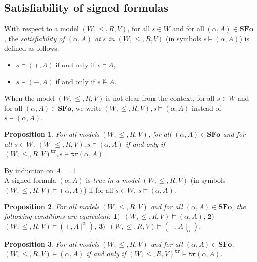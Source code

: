 \documentclass[draft]{article}
\newtheorem{proposition}{Proposition}
\newenvironment{proof}{{\bf Proof:}}{~$\dashv$\\}
\def\SFo{\mathbf{SFo}}
\begin{document}
\subsection{Satisfiability of signed formulas}
%
%
With respect to a model $(W,{\leq},{R},V)$, for all $s{\in}W$ and for all $(\alpha,A){\in}\SFo$, the {\em satisfiability of $(\alpha,A)$ at $s$ in $(W,{\leq},{R},V)$}\/ (in symbols $s{\models}(\alpha,A)$) is defined as follows:
%
%
\begin{itemize}
%
%
\item $s{\models}(+,A)$ if and only if $s{\models}A$,
%
%
\item $s{\models}(-,A)$ if and only if $s{\not\models}A$.
%
%
\end{itemize}
%
%
When the model $(W,{\leq},{R},V)$ is not clear from the context, for all $s{\in}W$ and for all $(\alpha,A){\in}\SFo$, we write $(W,{\leq},{R},V),s{\models}(\alpha,A)$ instead of $s{\models}(\alpha,A)$.
%
%
\begin{proposition}\label{Proposition:about:duality:valuation:complement:valuation:transpose:formulas}
%
%
For all models $(W,{\leq},{R},V)$, for all $(\alpha,A){\in}\SFo$ and for all $s{\in}W$, $(W,{\leq},{R},V),s{\models}(\alpha,A)$ if and only if $(W,{\leq},{R},V)^{\mathtt{tr}},s{\models}\mathtt{tr}(\alpha,A)$.
%
%
\end{proposition}
%
%
\begin{proof}
%
%
By induction on $A$.
%
%
\medskip
%
%
\end{proof}
%
%
%
%
A signed formula $(\alpha,A)$ is {\em true in a model $(W,{\leq},{R},V)$}\/ (in symbols $(W,{\leq},{R},V){\models}
%
%
%
%
%
%
%
$\linebreak$
%
%
%
%
%
%
(\alpha,A)$) if for all $s{\in}W$, $s{\models}(\alpha,A)$.
%
%
\begin{proposition}\label{proposition:about:truth:in:a:model:and:signs:of:signed:formulas}
%
%
For all models $(W,{\leq},{R},V)$ and for all $(\alpha,A){\in}\SFo$, the following conditions are equivalent: $\mathbf{1)}$~$(W,{\leq},{R},V){\models}(\alpha,A)$; $\mathbf{2)}$~$(W,{\leq},{R},V){\models}(+,A{\mid}^{\alpha})$;
%
%
%
%
%
%
%
\linebreak$
%
%
%
%
%
%
\mathbf{3)}$~$(W,{\leq},{R},V){\models}(-,A{\mid}_{\alpha})$.
%
%
\end{proposition}
%
%
\begin{proposition}\label{Proposition:about:duality:valuation:complement:valuation:transpose:formulas:validity:model}
%
%
For all models $(W,{\leq},{R},V)$ and for all $(\alpha,A){\in}\SFo$, $(W,{\leq},{R},V){\models}
%
%
%
%
%
%
%
$\linebreak$
%
%
%
%
%
%
(\alpha,A)$ if and only if $(W,{\leq},{R},V)^{\mathtt{tr}}{\models}\mathtt{tr}(\alpha,A)$.
%
%
\end{proposition}
\end{document}
